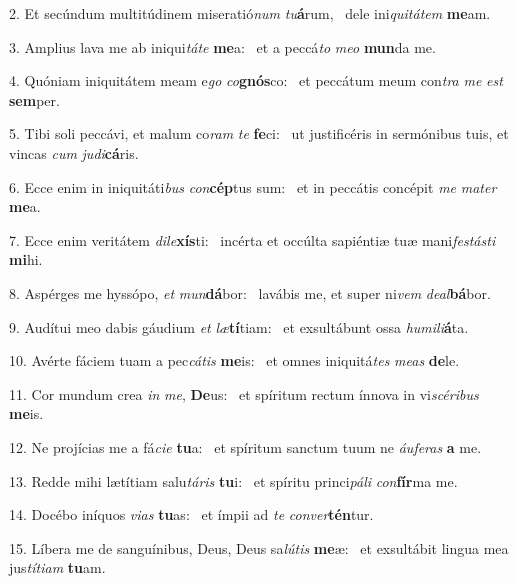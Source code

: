 2. Et secúndum multitúdinem miseratió\textit{num} \textit{tu}\textbf{á}rum, \ast\  dele ini\textit{qui}\textit{tá}\textit{tem} \textbf{me}am.\

3. Amplius lava me ab iniqui\textit{tá}\textit{te} \textbf{me}a: \ast\  et a peccá\textit{to} \textit{me}\textit{o} \textbf{mun}da me.\

4. Quóniam iniquitátem meam e\textit{go} \textit{co}\textbf{gnós}co: \ast\  et peccátum meum con\textit{tra} \textit{me} \textit{est} \textbf{sem}per.\

5. Tibi soli peccávi, et malum co\textit{ram} \textit{te} \textbf{fe}ci: \ast\  ut justificéris in sermónibus tuis, et vincas \textit{cum} \textit{ju}\textit{di}\textbf{cá}ris.\

6. Ecce enim in iniquitáti\textit{bus} \textit{con}\textbf{cép}tus sum: \ast\  et in peccátis concépit \textit{me} \textit{ma}\textit{ter} \textbf{me}a.\

7. Ecce enim veritátem \textit{di}\textit{le}\textbf{xís}ti: \ast\  incérta et occúlta sapiéntiæ tuæ mani\textit{fes}\textit{tás}\textit{ti} \textbf{mi}hi.\

8. Aspérges me hyssópo, \textit{et} \textit{mun}\textbf{dá}bor: \ast\  lavábis me, et super ni\textit{vem} \textit{de}\textit{al}\textbf{bá}bor.\

9. Audítui meo dabis gáudium \textit{et} \textit{læ}\textbf{tí}tiam: \ast\  et exsultábunt ossa \textit{hu}\textit{mi}\textit{li}\textbf{á}ta.\

10. Avérte fáciem tuam a pec\textit{cá}\textit{tis} \textbf{me}is: \ast\  et omnes iniquitá\textit{tes} \textit{me}\textit{as} \textbf{de}le.\

11. Cor mundum crea \textit{in} \textit{me}, \textbf{De}us: \ast\  et spíritum rectum ínnova in vi\textit{scé}\textit{ri}\textit{bus} \textbf{me}is.\

12. Ne projícias me a fá\textit{ci}\textit{e} \textbf{tu}a: \ast\  et spíritum sanctum tuum ne \textit{áu}\textit{fe}\textit{ras} \textbf{a} me.\

13. Redde mihi lætítiam salu\textit{tá}\textit{ris} \textbf{tu}i: \ast\  et spíritu princi\textit{pá}\textit{li} \textit{con}\textbf{fír}ma me.\

14. Docébo iníquos \textit{vi}\textit{as} \textbf{tu}as: \ast\  et ímpii ad \textit{te} \textit{con}\textit{ver}\textbf{tén}tur.\

15. Líbera me de sanguínibus, Deus, Deus sa\textit{lú}\textit{tis} \textbf{me}æ: \ast\  et exsultábit lingua mea jus\textit{tí}\textit{ti}\textit{am} \textbf{tu}am.\

